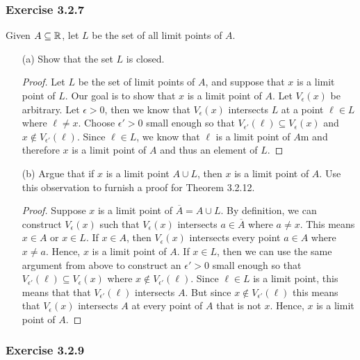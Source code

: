 \subsubsection{Exercise 3.2.7} Given \( A \subseteq \mathbb{R}  \), let \( L  \) be the set of all limit points of \( A \). 
\begin{enumerate}
    \item[(a)] Show that the set \( L  \) is closed. 
        \begin{proof}
            Let \( L \) be the set of limit points of \( A \), and suppose that \( x  \) is a limit point of \( L \). Our goal is to show that \( x  \) is a limit point of \( A \). Let \( V_{\epsilon }(x) \) be arbitrary. Let \( \epsilon > 0  \), then we know that \( V_{\epsilon }(x) \) intersects \( L \) at a point \( \ell \in L \) where \( \ell \neq x  \). Choose \( \epsilon' > 0  \) small enough so that \( V_{\epsilon'}(\ell) \subseteq V_{\epsilon }(x)\) and \( x \notin V_{\epsilon '}(\ell) \). Since \( \ell \in L \), we know that \( \ell  \) is a limit point of \( A \)m and therefore \( x \) is a limit point of \( A \) and thus an element of \( L \). 
        \end{proof}
    \item[(b)] Argue that if \( x  \) is a limit point \( A \cup L  \), then \( x  \) is a limit point of \( A \). Use this observation to furnish a proof for Theorem 3.2.12. 
        \begin{proof}
            Suppose \( x  \) is a limit point of \( \overline{A} = A \cup L  \). By definition, we can construct \( V_{\epsilon}(x) \) such that \( V_{\epsilon }(x) \) intersects \( a \in \overline{A} \) where \( a \neq x  \). This means \( x \in A \) or \( x \in L \). If \( x \in A \), then \( V_{\epsilon }(x) \) intersects every point \( a \in A \) where \( x \neq a \). Hence, \( x  \) is a limit point of \( A \). If \( x \in L \), then we can use the same argument from above to construct an \( \epsilon' > 0  \) small enough so that \( V_{\epsilon'}(\ell) \subseteq V_{\epsilon }(x) \) where \( x \notin V_{\epsilon'}(\ell) \). Since \( \ell \in L  \) is a limit point, this means that that \( V_{\epsilon'}(\ell) \) intersects \( A \). But since \( x \notin V_{\epsilon'}(\ell) \) this means that \( V_{\epsilon }(x) \) intersects \( A \) at every point of \( A \) that is not \( x \). Hence, \( x \) is a limit point of \( A \). 
        \end{proof}
\end{enumerate}


\subsubsection{Exercise 3.2.9}


